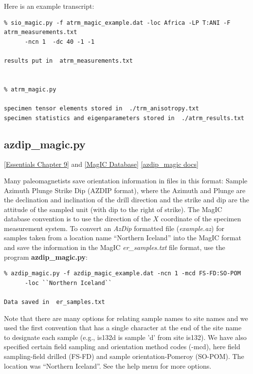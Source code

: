 \documentclass[11pt]{book}
\begin{document}
{{Here is an example transcript:

\begin{verbatim}
% sio_magic.py -f atrm_magic_example.dat -loc Africa -LP T:ANI -F atrm_measurements.txt
      -ncn 1  -dc 40 -1 -1

results put in  atrm_measurements.txt


% atrm_magic.py

specimen tensor elements stored in  ./trm_anisotropy.txt
specimen statistics and eigenparameters stored in  ./atrm_results.txt
\end{verbatim}


\subsection {azdip\_magic.py}
 \href{http://earthref.org/MAGIC/books/Tauxe/Essentials/WebBook3ch9.html#ch9}{[Essentials Chapter 9]} and \href{#MagICDatabase}{[MagIC Database]}%
 \href{https://github.com/PmagPy/PmagPy/blob/master/programs/azdip_magic.py}{[azdip\_magic docs]}

Many paleomagnetists save orientation information in files in this format:
Sample  Azimuth Plunge  Strike  Dip (AZDIP format),  where the Azimuth and Plunge are the declination and inclination of the drill direction and the strike and dip are the attitude of the sampled unit (with dip to the right of strike).   The MagIC database convention is to
use the direction of the $X$ coordinate of the specimen measurement system.  To convert an  {\it AzDip} formatted file ({\it example.az}) for samples taken from a location name ``Northern Iceland''  into the MagIC format and save the information in the MagIC {\it er\_samples.txt}  file format, use the program {\bf azdip\_magic.py}:

\begin{verbatim}
% azdip_magic.py -f azdip_magic_example.dat -ncn 1 -mcd FS-FD:SO-POM
      -loc ``Northern Iceland``

Data saved in  er_samples.txt
\end{verbatim}

Note that there are many options for relating sample names to site names and we used the first convention that has a single character at the end of the site name to designate each sample (e.g., is132d is sample 'd' from site is132).   We have also specified certain field sampling and orientation method codes (-mcd), here field sampling-field drilled (FS-FD) and sample orientation-Pomeroy (SO-POM).  The location was ``Northern Iceland''.   See the help menu for more options.

}}
\end{document}

